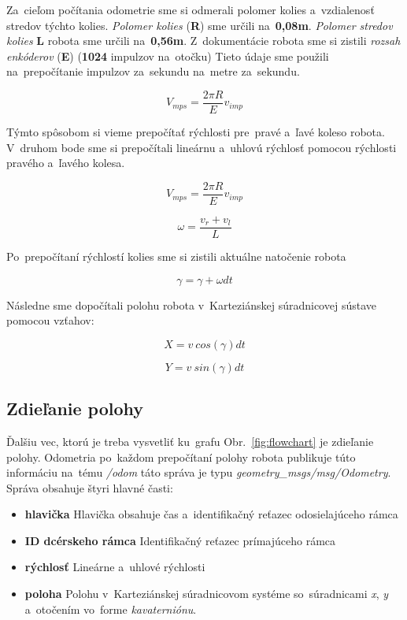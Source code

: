 Za~cieľom počítania odometrie sme si odmerali polomer kolies a~vzdialenosť stredov týchto kolies.
\textit{Polomer kolies} (\textbf{R}) sme určili na~\textbf{0,08m}. \textit{Polomer stredov kolies}
\textbf{L} robota sme určili na~\textbf{0,56m}. Z~dokumentácie robota \cite{encoder} sme si zistili
\textit{rozsah enkóderov} (\textbf{E}) (\textbf{1024} impulzov na~otočku)  Tieto údaje sme použili
na~prepočítanie impulzov za~sekundu na~metre za~sekundu.

\begin{equation}
	V_{mps} = \frac{2 \pi R}{E} v_{imp}
	\label{eq:vmps}
\end{equation}

Týmto spôsobom si vieme prepočítať rýchlosti pre~pravé a~ľavé koleso robota.
V~druhom bode sme si prepočítali lineárnu a~uhlovú rýchlosť pomocou rýchlosti pravého a~ľavého kolesa.

\begin{equation}
	V_{mps} = \frac{2 \pi R}{E} v_{imp}
	\label{eq:vlin}
\end{equation}


\begin{equation}
	\omega = \frac{v_{r} + v_{l}}{L}
	\label{eq:vang}
\end{equation}

Po~prepočítaní rýchlostí kolies sme si zistili aktuálne natočenie robota

\begin{equation}
	\gamma = \gamma + \omega dt
	\label{eq:angZ}
\end{equation}

Následne sme dopočítali polohu robota v~Karteziánskej súradnicovej sústave pomocou vzťahov:

\begin{equation}
	X = v~cos(\gamma) dt
	\label{eq:posX}
\end{equation}


\begin{equation}
	Y = v~sin(\gamma) dt
	\label{eq:posY}
\end{equation}


\subsection{Zdieľanie polohy}
\label{sec:zdielanie_polohy}

Ďalšiu vec, ktorú je treba vysvetliť ku~grafu Obr.~\ref{fig:flowchart} je zdieľanie polohy. Odometria
po~každom prepočítaní polohy robota publikuje túto informáciu na~tému \textit{/odom} táto správa je typu
\textit{geometry\_msgs/msg/Odometry}. Správa obsahuje štyri hlavné časti:
\begin{itemize}
	\item \textbf{hlavička} Hlavička obsahuje čas a~identifikačný reťazec odosielajúceho rámca
	\item \textbf{ID dcérskeho rámca} Identifikačný reťazec prímajúceho rámca
	\item \textbf{rýchlosť} Lineárne a~uhlové rýchlosti
	\item \textbf{poloha} Polohu v~Karteziánskej súradnicovom systéme so~súradnicami \textit{x}, \textit{y}
		a~otočením vo~forme \textit{kavaterniónu}.
\end{itemize}

